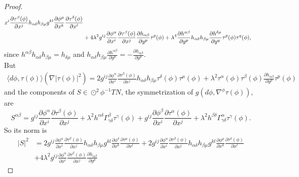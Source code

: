 \documentclass[12pt]{amsart}
\theoremstyle{plain}
\theoremstyle{definition}
\begin{document}
\begin{proof}
\begin{align*}
{x^{i}} \frac{\partial \tau^{\beta}(\phi)}{\partial x^{j}}
h_{\alpha\delta}h_{\beta\mu} g^{kl} \frac{\partial \phi^{\mu}}{\partial x^{k}}
\frac{\partial
\tau^{\delta}(\phi)}{\partial x^{l}} \notag\\
& + 4 \lambda^{2} g^{ij} \frac{\partial \phi^{\alpha}}{\partial x^{i}} \frac{\partial
\tau^{\beta}(\phi)}{\partial x^{j}} \frac{\partial h_{\alpha\beta}}{\partial y^{p}}
\tau^{p}(\phi) + \lambda^{4} \frac{\partial h^{\alpha\beta}}{\partial y^{p}}
h_{\alpha\delta}h_{\beta\mu} \frac{\partial h^{\delta\mu}}{\partial y^{q}}
\tau^{p}(\phi) \tau^{q}(\phi) , \notag
\end{align*}
since $h^{\alpha\beta}h_{\alpha\delta}h_{\beta\mu} = h_{\delta\mu}$ and
$h_{\alpha\delta}h_{\beta\mu}\frac{\partial h^{\alpha\beta}}{\partial y^{p}} = -
\frac{\partial
h_{\alpha\beta}}{\partial y^{p}}$.\\
But
\begin{align*}
\langle d\phi, \tau(\phi) \rangle (\nabla |\tau(\phi)|^{2}) = 2 g^{ij} \frac{\partial
\phi^{\alpha}}{\partial x^{i}} \frac{\partial \tau^{\beta}(\phi)}{\partial x^{j}}
h_{\alpha\delta}h_{\beta\mu} \tau^{\delta}(\phi)\tau^{\mu}(\phi)
  +  \lambda^{2} \tau^{\alpha}(\phi)\tau^{\beta}(\phi)
\frac{\partial h_{\alpha\beta}}{\partial y^{p}} \tau^{p}(\phi)
\end{align*}
and the components of $S \in \odot^{2} \phi^{-1}TN$, the symmetrization of $g(d\phi ,
\nabla^{\phi}\tau(\phi) )$, are
$$ S^{\alpha\beta} =  g^{ij} \frac{\partial \phi^{\alpha}}{\partial x^{i}}
\frac{\partial \tau^{\beta}(\phi)}{\partial x^{j}} + \lambda^{2} h^{\alpha\delta}
\Gamma^{\beta}_{\gamma\delta} \tau^{\gamma}(\phi)
  + g^{ij} \frac{\partial \phi^{\beta}}{\partial x^{i}}
\frac{\partial \tau^{\alpha}(\phi)}{\partial x^{j}} + \lambda^{2} h^{\beta\delta}
\Gamma^{\alpha}_{\gamma\delta} \tau^{\gamma}(\phi) .
$$
So its norm is
\begin{align*}
|S|^{2} &= 2 g^{ij} \frac{\partial \phi^{\alpha}}{\partial x^{i}} \frac{\partial
\tau^{\beta}(\phi)}{\partial x^{j}} h_{\alpha\delta}h_{\beta\mu} g^{kl}
\frac{\partial \phi^{\delta}}{\partial x^{k}} \frac{\partial
\tau^{\mu}(\phi)}{\partial x^{l}} +  2 g^{ij} \frac{\partial \phi^{\alpha}}{\partial
x^{i}} \frac{\partial \tau^{\beta}(\phi)}{\partial x^{j}}
h_{\alpha\delta}h_{\beta\mu} g^{kl} \frac{\partial \phi^{\mu}}{\partial x^{k}}
\frac{\partial
\tau^{\delta}(\phi)}{\partial x^{l}} \\
& + 4 \lambda^{2} g^{ij} \frac{\partial \phi^{\alpha}}{\partial x^{i}} \frac{\partial
\tau^{\beta}(\phi)}{\partial x^{j}} \frac{\partial h_{\alpha\beta}}{\partial y^{p}}

\end{align*}
\end{proof}
\end{document}
